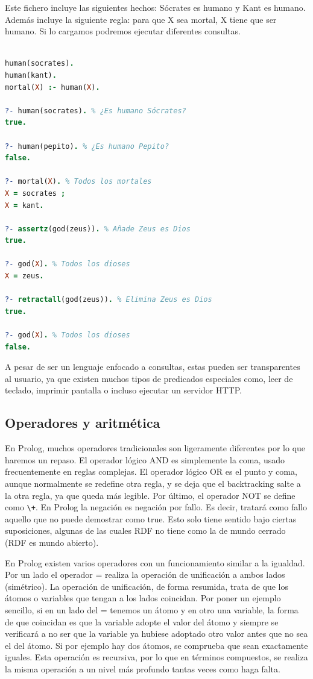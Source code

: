 \documentclass[12pt]{report} %
\begin{document}
Este fichero incluye las siguientes hechos: Sócrates es humano y Kant es humano. Además incluye la siguiente regla: para que X sea mortal, X tiene que ser humano. Si lo cargamos podremos ejecutar diferentes consultas.

\begin{lstlisting}[language=Prolog,float,floatplacement=H]

human(socrates).
human(kant).
mortal(X) :- human(X).

?- human(socrates). % ¿Es humano Sócrates?
true.

?- human(pepito). % ¿Es humano Pepito?
false.

?- mortal(X). % Todos los mortales
X = socrates ;
X = kant.

?- assertz(god(zeus)). % Añade Zeus es Dios
true.

?- god(X). % Todos los dioses
X = zeus.

?- retractall(god(zeus)). % Elimina Zeus es Dios
true.

?- god(X). % Todos los dioses
false.
\end{lstlisting}


A pesar de ser un lenguaje enfocado a consultas, estas pueden ser transparentes al usuario, ya que existen muchos tipos de predicados especiales como, leer de teclado, imprimir pantalla o incluso ejecutar un servidor HTTP.

\subsection{Operadores y aritmética}

En Prolog, muchos operadores tradicionales son ligeramente diferentes por lo que haremos un repaso. El operador lógico AND es simplemente la coma, usado frecuentemente en reglas complejas. El operador lógico OR es el punto y coma, aunque normalmente se redefine otra regla, y se deja que el backtracking salte a la otra regla, ya que queda más legible. Por último, el operador NOT se define como \verb|\+|. En Prolog la negación es negación por fallo. Es decir, tratará como fallo aquello que no puede demostrar como true. Esto solo tiene sentido bajo ciertas suposiciones, algunas de las cuales RDF no tiene como la de mundo cerrado (RDF es mundo abierto).

En Prolog existen varios operadores con un funcionamiento similar a la igualdad. Por un lado el operador = realiza la operación de unificación a ambos lados (simétrico). La operación de unificación, de forma resumida, trata de que los átomos o variables que tengan a los lados coincidan. Por poner un ejemplo sencillo, si en un lado del = tenemos un átomo y en otro una variable, la forma de que coincidan es que la variable adopte el valor del átomo y siempre se verificará a no ser que la variable ya hubiese adoptado otro valor antes que no sea el del átomo. Si por ejemplo hay dos átomos, se comprueba que sean exactamente iguales. Esta operación es recursiva, por lo que en términos compuestos, se realiza la misma operación a un nivel más profundo tantas veces como haga falta.
\end{document}
